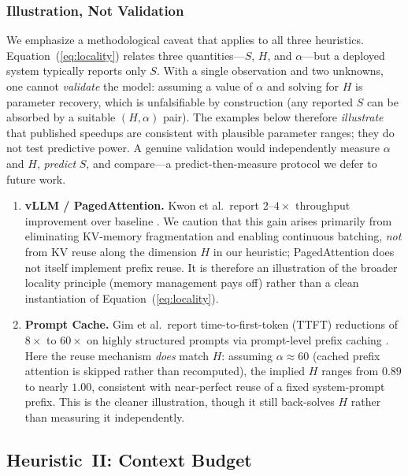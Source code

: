 \subsubsection{Illustration, Not Validation}

We emphasize a methodological caveat that applies to all three heuristics. Equation~(\ref{eq:locality}) relates three quantities---$S$, $H$, and $\alpha$---but a deployed system typically reports only $S$. With a single observation and two unknowns, one cannot \emph{validate} the model: assuming a value of $\alpha$ and solving for $H$ is parameter recovery, which is unfalsifiable by construction (any reported $S$ can be absorbed by a suitable $(H,\alpha)$ pair). The examples below therefore \emph{illustrate} that published speedups are consistent with plausible parameter ranges; they do not test predictive power. A genuine validation would independently measure $\alpha$ and $H$, \emph{predict} $S$, and compare---a predict-then-measure protocol we defer to future work.

\begin{enumerate}[nosep]
\item \textbf{vLLM / PagedAttention.} Kwon et al.\ report $2$--$4\times$ throughput improvement over baseline \cite{kwon2023pagedattention}. We caution that this gain arises primarily from eliminating KV-memory fragmentation and enabling continuous batching, \emph{not} from KV reuse along the dimension $H$ in our heuristic; PagedAttention does not itself implement prefix reuse. It is therefore an illustration of the broader locality principle (memory management pays off) rather than a clean instantiation of Equation~(\ref{eq:locality}).

\item \textbf{Prompt Cache.} Gim et al.\ report time-to-first-token (TTFT) reductions of $8\times$ to $60\times$ on highly structured prompts via prompt-level prefix caching \cite{gim2024promptcache}. Here the reuse mechanism \emph{does} match $H$: assuming $\alpha \approx 60$ (cached prefix attention is skipped rather than recomputed), the implied $H$ ranges from $0.89$ to nearly $1.00$, consistent with near-perfect reuse of a fixed system-prompt prefix. This is the cleaner illustration, though it still back-solves $H$ rather than measuring it independently.
\end{enumerate}

\subsection{Heuristic~II: Context Budget}
\label{sec:law2}


